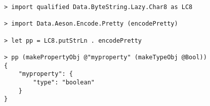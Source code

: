 \begin{repl}\begin{lstlisting}
> import qualified Data.ByteString.Lazy.Char8 as LC8

> import Data.Aeson.Encode.Pretty (encodePretty)

> let pp = LC8.putStrLn . encodePretty

> pp (makePropertyObj @"myproperty" (makeTypeObj @Bool))
{
    "myproperty": {
        "type": "boolean"
    }
}\end{lstlisting}\end{repl}
